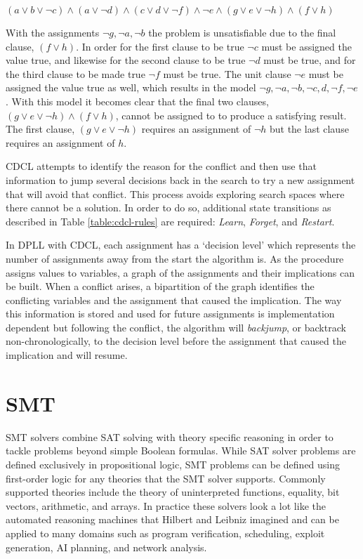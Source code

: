 \documentclass[]{final_report}
\begin{document}
$(a \lor b \lor \lnot c) \land (a \lor \lnot d) \land (c \lor d \lor \lnot{f}) \land \lnot{e} \land (g \lor e \lor \lnot h) \land (f \lor h)$

With the assignments $\lnot{g}, \lnot{a}, \lnot{b}$ the problem is unsatisfiable due to the final clause, $(f \lor h)$. In order for the first clause to be true $\lnot c$ must be assigned the value true, and likewise for the second clause to be true $\lnot d$ must be true, and for the third clause to be made true $\lnot{f}$ must be true. The unit clause $\lnot{e}$ must be assigned the value true as well, which results in the model $\lnot{g}, \lnot{a}, \lnot{b}, \lnot{c}, d, \lnot{f}, \lnot{e}$. With this model it becomes clear that the final two clauses, $(g \lor e \lor \lnot h) \land (f \lor h)$, cannot be assigned to to produce a satisfying result. The first clause, $(g \lor e \lor \lnot h)$ requires an assignment of $\lnot{h}$ but the last clause requires an assignment of $h$.

CDCL attempts to identify the reason for the conflict and then use that information to jump several decisions back in the search to try a new assignment that will avoid that conflict. This process avoids exploring search spaces where there cannot be a solution. In order to do so, additional state transitions as described in Table \ref{table:cdcl-rules} are required: \textit{Learn}, \textit{Forget}, and \textit{Restart}.

In DPLL with CDCL, each assignment has a `decision level' which represents the number of assignments away from the start the algorithm is. As the procedure assigns values to variables, a graph of the assignments and their implications can be built. When a conflict arises, a bipartition of the graph identifies the conflicting variables and the assignment that caused the implication. The way this information is stored and used for future assignments is implementation dependent but following the conflict, the algorithm will \textit{backjump}, or backtrack non-chronologically, to the decision level before the assignment that caused the implication and will resume.

\section{SMT}

SMT solvers combine SAT solving with theory specific reasoning in order to tackle problems beyond simple Boolean formulas. While SAT solver problems are defined exclusively in propositional logic, SMT problems can be defined using first-order logic for any theories that the SMT solver supports. Commonly supported theories include the theory of uninterpreted functions, equality, bit vectors, arithmetic, and arrays. In practice these solvers look a lot like the automated reasoning machines that Hilbert and Leibniz imagined and can be applied to many domains such as program verification, scheduling, exploit generation, AI planning, and network analysis.
\end{document}
